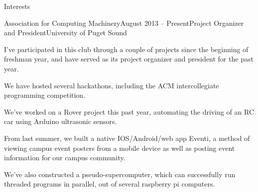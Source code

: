 \documentclass{resume} %
\begin{document}
\begin{rSection}{Interests}

\begin{rSubsection}{Association for Computing Machinery}{August 2013 -- Present}{Project Organizer and President}{University of Puget Sound}

\item I've participated in this club through a couple of projects since the beginning of freshman year, and have served as its project organizer and president for the past year.
\item We have hosted several hackathons, including the ACM intercollegiate programming competition.
\item We've worked on a Rover project this past year, automating the driving of an RC car using Arduino ultrasonic sensors.
\item From last summer, we built a native IOS/Android/web app Eventi, a method of viewing campus event posters from a mobile device as well as posting event information for our campus community.
\item We've also constructed a pseudo-supercomputer, which can successfully run threaded programs in parallel, out of several raspberry pi computers. 
\end{rSubsection}


\end{rSection}
\end{document}
